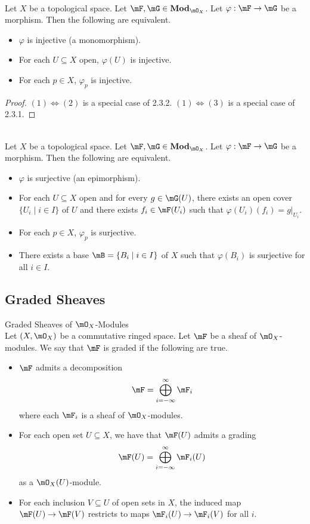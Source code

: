 \documentclass[a4paper]{article}
\begin{document}
\begin{prp}{}{}\\
Let $X$ be a topological space. Let $\mF,\mG\in\bold{Mod}_{\mO_X}$. Let $\varphi:\mF\to\mG$ be a morphism. Then the following are equivalent. 
\begin{itemize}
\item $\varphi$ is injective (a monomorphism). 
\item For each $U\subseteq X$ open, $\varphi(U)$ is injective. 
\item For each $p\in X$, $\varphi_p$ is injective. 
\end{itemize}
\begin{proof}
$(1)\iff(2)$ is a special case of 2.3.2. $(1)\iff(3)$ is a special case of 2.3.1. 
\end{proof}
\end{prp}

\begin{prp}{}{}\\
Let $X$ be a topological space. Let $\mF,\mG\in\bold{Mod}_{\mO_X}$. Let $\varphi:\mF\to\mG$ be a morphism. Then the following are equivalent. 
\begin{itemize}
\item $\varphi$ is surjective (an epimorphism). 
\item For each $U\subseteq X$ open and for every $g\in\mG(U)$, there exists an open cover $\{U_i\;|\;i\in I\}$ of $U$ and there exists $f_i\in\mF(U_i)$ such that $\varphi(U_i)(f_i)=g|_{U_i}$. 
\item For each $p\in X$, $\varphi_p$ is surjective. 
\item There exists a base $\mB=\{B_i\;|\;i\in I\}$ of $X$ such that $\varphi(B_i)$ is surjective for all $i\in I$. 
\end{itemize}
\end{prp}

\subsection{Graded Sheaves}
\begin{defn}{Graded Sheaves of $\mO_X$-Modules}{}\\
Let $(X,\mO_X)$ be a commutative ringed space. Let $\mF$ be a sheaf of $\mO_X$-modules. We say that $\mF$ is graded if the following are true. 
\begin{itemize}
\item $\mF$ admits a decomposition $$\mF=\bigoplus_{i=-\infty}^\infty \mF_i$$ where each $\mF_i$ is a sheaf of $\mO_X$-modules. 
\item For each open set $U\subseteq X$, we have that $\mF(U)$ admits a grading $$\mF(U)=\bigoplus_{i=-\infty}^\infty\mF_i(U)$$ as a $\mO_X(U)$-module. 
\item For each inclusion $V\subseteq U$ of open sets in $X$, the induced map $\mF(U)\to\mF(V)$ restricts to maps $\mF_i(U)\to\mF_i(V)$ for all $i$. 
\end{itemize}
\end{defn}
\end{document}
